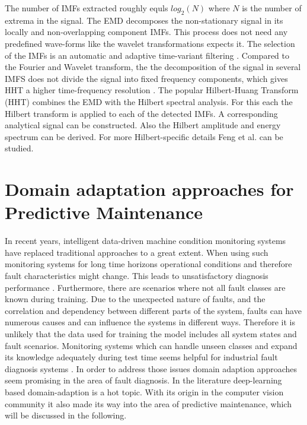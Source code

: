 The number of IMFs extracted roughly equls $log_{2}(N)$ where $N$ is the number of extrema in the signal. The EMD decomposes the non-stationary signal in its locally and non-overlapping component IMFs. This process does not need any predefined wave-forms like the wavelet transformations expects it. The selection of the IMFs is an automatic and adaptive time-variant filtering  \cite{Faltermeier2010}. Compared to the Fourier and Wavelet transform, the the decomposition of the signal in several IMFS does not divide the signal into fixed frequency components, which gives HHT a higher time-frequency resolution \cite{Verstraete2017}. The popular Hilbert-Huang Transform (HHT) combines the EMD with the Hilbert spectral analysis. For this each the Hilbert transform is applied to each of the detected IMFs. A corresponding analytical signal can be constructed. Also the Hilbert amplitude and energy spectrum can be derived. For more Hilbert-specific details Feng et al. \cite{FENG2013} can be studied.


\section{Domain adaptation approaches for Predictive Maintenance}
In recent years, intelligent data-driven machine condition monitoring systems have replaced traditional approaches to a great extent. When using such monitoring systems for long time horizons operational conditions and therefore fault characteristics might change. This leads to unsatisfactory diagnosis performance \cite{AZAMFAR2020103932}. Furthermore, there are scenarios where not all fault classes are known during training. Due to the unexpected nature of faults, and the correlation and dependency between different parts of the system, faults can have numerous causes and can influence the systems in different ways. Therefore it is unlikely that the data used for training the model includes all system states and fault scenarios. Monitoring systems which can handle unseen classes and expand its knowledge adequately during test time seems helpful for industrial fault diagnosis systems \cite{Michau2017}. In order to address those issues domain adaption approaches seem promising in the area of fault diagnosis. In the literature deep-learning based domain-adaption is a hot topic. With its origin in the computer vision community it also made its way into the area of predictive maintenance, which will be discussed in the following. 

